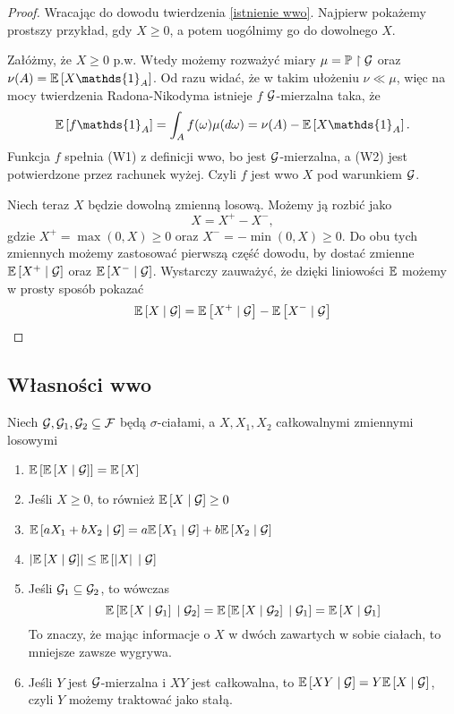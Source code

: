 \begin{proof}
  Wracając do dowodu twierdzenia \ref{istnienie wwo}. Najpierw pokażemy prostszy przykład, gdy $X\geq0$, a potem uogólnimy go do dowolnego $X$.

  Załóżmy, że $X\geq0$ p.w. Wtedy możemy rozważyć miary $\mu=\prob\restriction\set{G}$ oraz $\nu(A)=\expected{X\mathds{1}_A}$. Od razu widać, że w takim ułożeniu $\nu\ll\mu$, więc na mocy twierdzenia Radona-Nikodyma istnieje $f$ $\mathcal{G}$-mierzalna taka, że
  $$\expected{f\mathds{1}_A}=\int_Af(\omega)\mu(d\omega)=\nu(A)-\expected{X\mathds{1}_A}.$$
  Funkcja $f$ spełnia (W1) z definicji wwo, bo jest $\mathcal{G}$-mierzalna, a (W2) jest potwierdzone przez rachunek wyżej. Czyli $f$ jest wwo $X$ pod warunkiem $\mathcal{G}$.

  Niech teraz $X$ będzie dowolną zmienną losową. Możemy ją rozbić jako 
  $$X=X^+-X^-,$$ 
  gdzie $X^+=\max(0,X)\geq0$ oraz $X^-=-\min(0,X)\geq0$. Do obu tych zmiennych możemy zastosować pierwszą część dowodu, by dostać zmienne $\expected{X^+}{\set{G}}$ oraz $\expected{X^-}{\set{G}}$. Wystarczy zauważyć, że dzięki liniowości $\expected$ możemy w prosty sposób pokazać
  $$\expected{X}{\set{G}}=\expected{X^+}{\set{G}}-\expected{X^-}{\set{G}}$$
\end{proof}

\subsection{Własności wwo}

\begin{theorem}\label{o arytmetyce wwo}
  Niech $\mathcal{G},\mathcal{G}_1,\mathcal{G}_2\subseteq\mathcal{F}$ będą $\sigma$-ciałami, a $X,X_1,X_2$ całkowalnymi zmiennymi losowymi
  \begin{enumerate}[topsep=8pt, parsep=8pt]
    \item $\expected{\expected{X}{\set{G}}}=\expected{X}$
    \item Jeśli $X\geq0$, to również $\expected{X}{\set{G}}\geq0$
    \item $\expected{aX_1+bX_2}{\set{G}}=a\expected{X_1}{\set{G}}+b\expected{X_2}{\set{G}}$
    \item $\left| \expected{X}{\set{G}} \right| \leq \expected{\left| X\right| }{\set{G}}$
    \item Jeśli $\mathcal{G}_1\subseteq\mathcal{G}_2$, to wówczas
      $$\expected{\expected{X}{\set{G}_1}}{\set{G}_2}=\expected{\expected{X}{\set{G}_2}}{\set{G}_1}=\expected{X}{\set{G}_1}$$
      To znaczy, że mając informacje o $X$ w dwóch zawartych w sobie ciałach, to mniejsze zawsze wygrywa.
    \item Jeśli $Y$ jest $\mathcal{G}$-mierzalna i $XY$ jest całkowalna, to $\expected{XY}{\set{G}}=Y\expected{X}{\set{G}}$, czyli $Y$ możemy traktować jako stałą.
  \end{enumerate}
\end{theorem}

